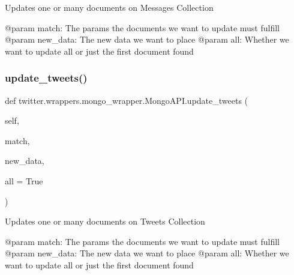 \begin{DoxyVerb}Updates one or many documents on Messages Collection

@param match: The params the documents we want to update must fulfill
@param new_data: The new data we want to place
@param all: Whether we want to update all or just the first document found
\end{DoxyVerb}
 \mbox{\label{classtwitter_1_1wrappers_1_1mongo__wrapper_1_1MongoAPI_a2b622e0eb9a3f45ecdf4b5f620f0231e}} 
\subsubsection{\texorpdfstring{update\+\_\+tweets()}{update\_tweets()}}
{\footnotesize\ttfamily def twitter.\+wrappers.\+mongo\+\_\+wrapper.\+Mongo\+A\+P\+I.\+update\+\_\+tweets (\begin{DoxyParamCaption}\item[{}]{self,  }\item[{}]{match,  }\item[{}]{new\+\_\+data,  }\item[{}]{all = {\ttfamily True} }\end{DoxyParamCaption})}

\begin{DoxyVerb}Updates one or many documents on Tweets Collection

@param match: The params the documents we want to update must fulfill
@param new_data: The new data we want to place
@param all: Whether we want to update all or just the first document found
\end{DoxyVerb}
 \mbox{\label{classtwitter_1_1wrappers_1_1mongo__wrapper_1_1MongoAPI_aa4b9a6fb625844e6b78072b8818affd7}} 
